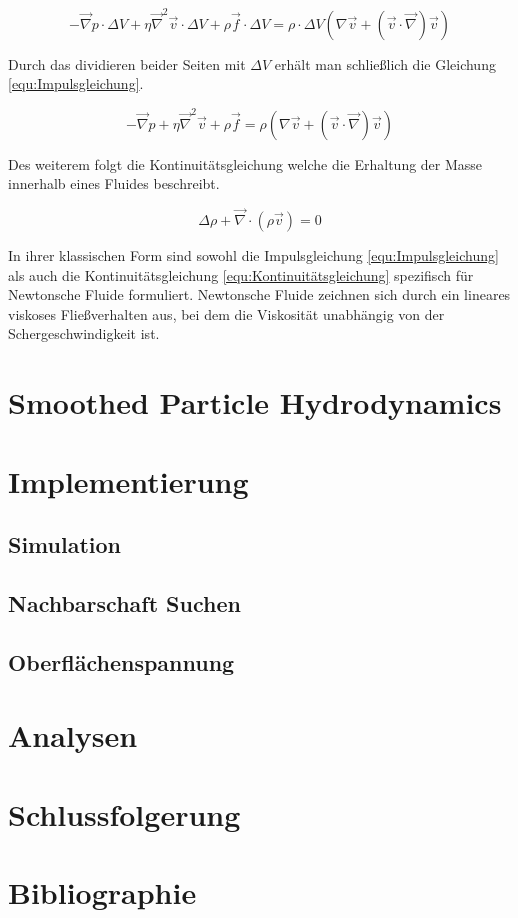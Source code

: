 \documentclass[a4paper, 12pt]{article}
\begin{document}
\[- \vec{\nabla}p \cdot \Delta V + \eta \vec{\nabla}^2 \vec{v} \cdot \Delta V + \rho \vec{f} \cdot \Delta V = \rho \cdot \Delta V (\nabla \vec{v} + (\vec{v} \cdot \vec{\nabla})\vec{v})\]

Durch das dividieren beider Seiten mit $\Delta V$ erhält man schließlich die Gleichung \eqref{equ:Impulsgleichung}.

\[- \vec{\nabla}p + \eta \vec{\nabla}^2 \vec{v} + \rho \vec{f} = \rho (\nabla \vec{v} + (\vec{v} \cdot \vec{\nabla})\vec{v})\]

Des weiterem folgt die Kontinuitätsgleichung welche die Erhaltung der Masse innerhalb eines Fluides beschreibt. 

\begin{equation} \label{equ:Kontinuitätsgleichung}
    \Delta \rho + \vec{\nabla} \cdot (\rho \vec{v}) = 0
\end{equation}

In ihrer klassischen Form sind sowohl die Impulsgleichung \eqref{equ:Impulsgleichung} als auch die Kontinuitätsgleichung \eqref{equ:Kontinuitätsgleichung} spezifisch für Newtonsche Fluide formuliert. Newtonsche Fluide zeichnen sich durch ein lineares viskoses Fließverhalten aus, bei dem die Viskosität unabhängig von der Schergeschwindigkeit ist.

\section{Smoothed Particle Hydrodynamics} \label{section_2}

\section{Implementierung} \label{section_3}
\subsection{Simulation}
\subsection{Nachbarschaft Suchen}
\subsection{Oberflächenspannung}

\section{Analysen} \label{section_4}

\section{Schlussfolgerung}

\section{Bibliographie}
\end{document}
